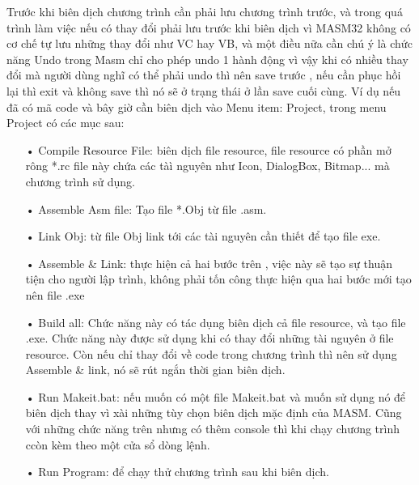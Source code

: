	Trước khi biên dịch chương trình cần phải lưu chương trình trước, và trong quá trình làm việc nếu có thay đổi phải lưu trước khi biên dịch vì MASM32 không có cơ chế tự lưu những thay đổi như VC hay VB, và một điều nữa cần chú ý là chức năng Undo trong Masm chỉ cho phép undo 1 hành động vì vậy khi có nhiều thay đổi mà người dùng nghĩ có thể phải undo thì nên save trước , nếu cần phục hồi lại thì exit và không save thì nó sẽ ở trạng thái ở lần save cuối cùng. Ví dụ nếu đã có mã code và bây giờ cần biên dịch vào Menu item: Project, trong menu Project có các mục sau: 
		\begin{itemize}
			\item[•] Compile Resource File: biên dịch file resource, file resource có phần mở rông *.rc file này chứa các tàì nguyên như Icon, DialogBox, Bitmap... mà chương trình sử dụng. 
		\item[•] Assemble Asm file: Tạo file *.Obj từ file .asm. 
		\item[•]  Link Obj: từ file Obj link tới các tài nguyên cần thiết để tạo file exe.
		 \item[•]  Assemble \& Link: thực hiện cả hai bước trên , việc này sẽ tạo sự thuận tiện cho người lập trình, không phải tốn công thực hiện qua hai bước mới tạo nên file .exe
		 \item[•]  Build all: Chức năng này có tác dụng biên dịch cả file resource, và tạo file .exe. Chức năng này được sử dụng khi  có thay đổi những tài nguyên ở file resource. Còn nếu chỉ thay đổi về code trong chương trình thì nên sử dụng Assemble \& link, nó sẽ rút ngắn thời gian biên dịch.
		 \item[•]  Run Makeit.bat: nếu muốn có một file Makeit.bat và muốn sử dụng nó để biên dịch thay vì xài những tùy chọn biên dịch mặc định của MASM. Cũng với những chức năng trên nhưng có thêm console thì khi chạy chương trình ccòn kèm theo một cửa sổ dòng lệnh.
		   \item[•]  Run Program: để chạy thử chương trình sau khi biên dịch. 
		\end{itemize}
		

